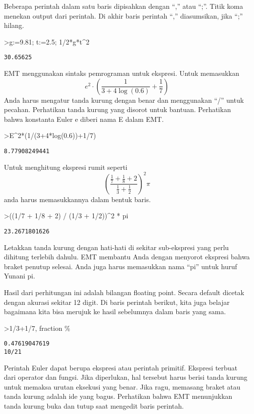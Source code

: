 \documentclass[
]{book}
\begin{document}
Beberapa perintah dalam satu baris dipisahkan dengan ``,'' atau ``;''. Titik koma menekan output dari perintah. Di akhir baris perintah ``,'' diasumsikan, jika ``;'' hilang.

\textgreater g:=9.81; t:=2.5; 1/2*g*t\^{}2

\begin{verbatim}
30.65625
\end{verbatim}

EMT menggunakan sintaks pemrograman untuk ekspresi. Untuk memasukkan \[e^2 \cdot \left( \frac{1}{3+4 \log(0.6)}+\frac{1}{7} \right)\]Anda harus mengatur tanda kurung dengan benar dan menggunakan ``/'' untuk pecahan. Perhatikan tanda kurung yang disorot untuk bantuan. Perhatikan bahwa konstanta Euler e diberi nama E dalam EMT.

\textgreater E\^{}2*(1/(3+4*log(0.6))+1/7)

\begin{verbatim}
8.77908249441
\end{verbatim}

Untuk menghitung ekspresi rumit seperti \[\left(\frac{\frac17 + \frac18 + 2}{\frac13 + \frac12}\right)^2 \pi\]anda harus memasukkannya dalam bentuk baris.

\textgreater((1/7 + 1/8 + 2) / (1/3 + 1/2))\^{}2 * pi

\begin{verbatim}
23.2671801626
\end{verbatim}

Letakkan tanda kurung dengan hati-hati di sekitar sub-ekspresi yang perlu dihitung terlebih dahulu. EMT membantu Anda dengan menyorot ekspresi bahwa braket penutup selesai. Anda juga harus memasukkan nama ``pi'' untuk huruf Yunani pi.

Hasil dari perhitungan ini adalah bilangan floating point. Secara default dicetak dengan akurasi sekitar 12 digit. Di baris perintah berikut, kita juga belajar bagaimana kita bisa merujuk ke hasil sebelumnya dalam baris yang sama.

\textgreater1/3+1/7, fraction \%

\begin{verbatim}
0.47619047619
10/21
\end{verbatim}

Perintah Euler dapat berupa ekspresi atau perintah primitif. Ekspresi terbuat dari operator dan fungsi. Jika diperlukan, hal tersebut harus berisi tanda kurung untuk memaksa urutan eksekusi yang benar. Jika ragu, memasang braket atau tanda kurung adalah ide yang bagus. Perhatikan bahwa EMT menunjukkan tanda kurung buka dan tutup saat mengedit baris perintah.
\end{document}

